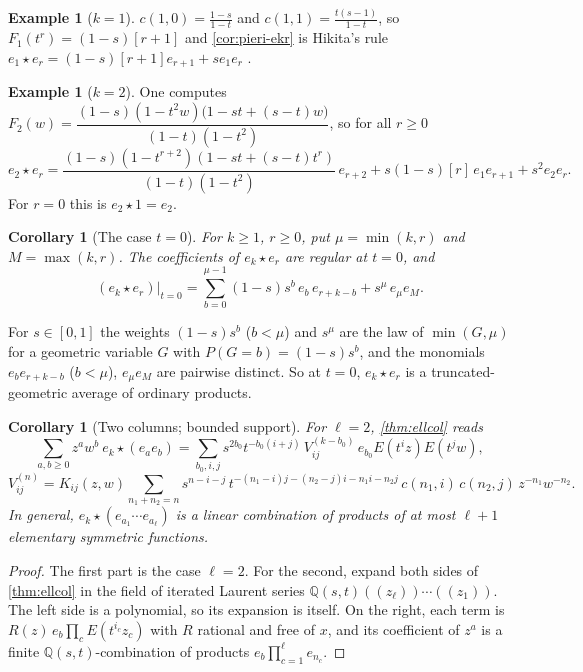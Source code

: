 \documentclass[11pt]{amsart}
\newtheorem{corollary}[theorem]{Corollary}
\theoremstyle{definition}
\newtheorem{example}[theorem]{Example}
\theoremstyle{remark}
\numberwithin{equation}{section}
\begin{document}
\begin{example}[$k=1$]\label{ex:k1}
$c(1,0)=\frac{1-s}{1-t}$ and $c(1,1)=\frac{t(s-1)}{1-t}$, so $F_1(t^r)=(1-s)[r+1]$ and \cref{cor:pieri-ekr} is Hikita's rule $e_1\star e_r=(1-s)[r+1]e_{r+1}+se_1e_r$ \cite[Thm.~3.12]{Hikita25}.
\end{example}

\begin{example}[$k=2$]\label{ex:k2}
One computes $F_2(w)=\dfrac{(1-s)(1-t^2w)\bigl(1-st+(s-t)w\bigr)}{(1-t)(1-t^2)}$, so for all $r\ge0$
\[ e_2\star e_r=\frac{(1-s)(1-t^{r+2})(1-st+(s-t)t^r)}{(1-t)(1-t^2)}\,e_{r+2}+s(1-s)[r]\,e_1e_{r+1}+s^2e_2e_r . \]
For $r=0$ this is $e_2\star1=e_2$.
\end{example}

\begin{corollary}[The case $t=0$]\label{cor:pieri-t0}
For $k\ge1$, $r\ge0$, put $\mu=\min(k,r)$ and $M=\max(k,r)$. The coefficients of $e_k\star e_r$ are regular at $t=0$, and
\[ (e_k\star e_r)\big|_{t=0}=\sum_{b=0}^{\mu-1}(1-s)s^b\,e_b\,e_{r+k-b}+s^\mu\,e_\mu e_M . \]
\end{corollary}
For $s\in[0,1]$ the weights $(1-s)s^b$ ($b<\mu$) and $s^\mu$ are the law of $\min(G,\mu)$ for a geometric variable $G$ with $P(G=b)=(1-s)s^b$, and the monomials $e_be_{r+k-b}$ ($b<\mu$), $e_\mu e_M$ are pairwise distinct. So at $t=0$, $e_k\star e_r$ is a truncated-geometric average of ordinary products.

\begin{corollary}[Two columns; bounded support]\label{cor:twocol}
For $\ell=2$, \cref{thm:ellcol} reads
\[ \sum_{a,b\ge0}z^aw^b\ e_k\star(e_ae_b)=\sum_{b_0,i,j}s^{2b_0}t^{-b_0(i+j)}\,V^{(k-b_0)}_{ij}\,e_{b_0}E(t^iz)E(t^jw), \]
\[ V^{(n)}_{ij}=K_{ij}(z,w)\sum_{n_1+n_2=n}s^{n-i-j}\,t^{-(n_1-i)j-(n_2-j)i-n_1i-n_2j}\,c(n_1,i)\,c(n_2,j)\,z^{-n_1}w^{-n_2}. \]
In general, $e_k\star(e_{a_1}\cdots e_{a_\ell})$ is a linear combination of products of at most $\ell+1$ elementary symmetric functions.
\end{corollary}
\begin{proof}
The first part is the case $\ell=2$. For the second, expand both sides of \cref{thm:ellcol} in the field of iterated Laurent series $\mathbb{Q}(s,t)((z_\ell))\cdots((z_1))$. The left side is a polynomial, so its expansion is itself. On the right, each term is $R(z)\,e_b\prod_cE(t^{i_c}z_c)$ with $R$ rational and free of $x$, and its coefficient of $z^a$ is a finite $\mathbb{Q}(s,t)$-combination of products $e_b\prod_{c=1}^\ell e_{n_c}$.
\end{proof}
\end{document}
